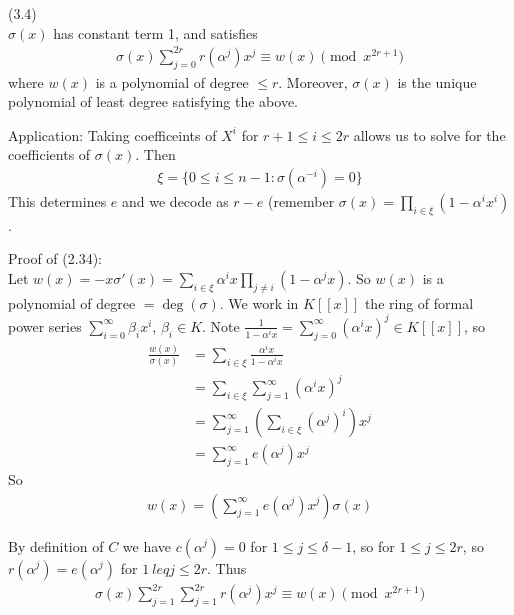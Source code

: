 \documentclass[a4paper]{article}
\begin{document}
\begin{thm} (3.4)\\
$\sigma(x)$ has constant term 1, and satisfies
\begin{equation*}
\begin{aligned}
\sigma(x) \sum_{j=0}^{2r} r(\alpha^j) x^j \equiv w(x) \pmod {x^{2r+1}}
\end{aligned}
\end{equation*}
where $w(x)$ is a polynomial of degree $\leq r$. Moreover, $\sigma(x)$ is the unique polynomial of least degree satisfying the above.
\end{thm}

Application: Taking coefficeints of $X^i$ for $r+1 \leq i \leq 2r$ allows us to solve for the coefficients of $\sigma(x)$. Then
\begin{equation*}
\begin{aligned}
\xi = \{0 \leq i \leq n-1: \sigma(\alpha^{-i}) = 0\}
\end{aligned}
\end{equation*}
This determines $e$ and we decode as $r-e$ (remember $\sigma(x) = \prod_{i \in \xi} (1-\alpha^i x^i)$.

Proof of (2.34):\\
Let $w(x) = -x \sigma'(x) =\sum_{i \in \xi} \alpha^i x \prod_{j \neq i} (1-\alpha^j x)$. So $w(x)$ is a polynomial of degree $=\deg(\sigma)$. We work in $K[[x]]$ the ring of formal power series $\sum_{i=0}^\infty \beta_ix^i$, $\beta_i \in K$. Note $\frac{1}{1-\alpha^ix} = \sum_{j=0}^\infty (\alpha^i x)^j \in K[[x]]$, so 
\begin{equation*}
\begin{aligned}
\frac{w(x)}{\sigma(x)} &= \sum_{i \in \xi} \frac{\alpha^i x}{1-\alpha^i x}\\
&= \sum_{i \in \xi} \sum_{j =1}^\infty (\alpha^i x)^j\\
&= \sum_{j=1}^\infty (\sum_{i \in \xi} (\alpha^j)^i) x^j\\
&= \sum_{j=1}^\infty e(\alpha^j) x^j
\end{aligned}
\end{equation*}
So
\begin{equation*}
\begin{aligned}
w(x) = (\sum_{j=1}^\infty e(\alpha^j) x^j) \sigma(x)
\end{aligned}
\end{equation*}

By definition of $C$ we have $c(\alpha^j)=0$ for $1 \leq j \leq \delta-1$, so for $1 \leq j \leq 2r$, so $r(\alpha^j) = e(\alpha^j)$ for $1\ leq j \leq 2r$. Thus
\begin{equation*}
\begin{aligned}
\sigma(x) \sum_{j=1}^{2r} \sum_{j=1}^{2r} r(\alpha^j) x^j \equiv w(x) \pmod {x^{2r+1}}
\end{aligned}
\end{equation*}
\end{document}
